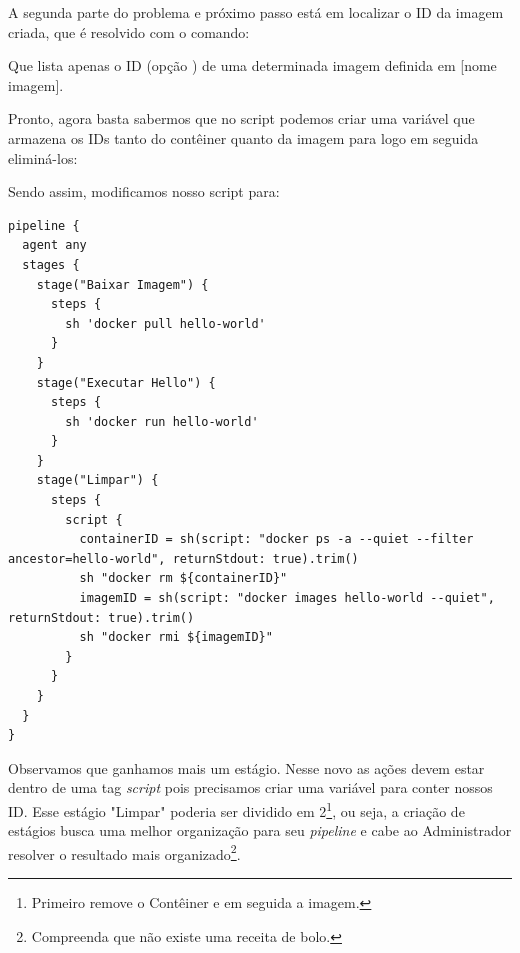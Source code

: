 \documentclass[a4paper,11pt]{article}
\begin{document}
A segunda parte do problema e próximo passo está em localizar o ID da imagem criada, que é resolvido com o comando:

Que lista apenas o ID (opção ) de uma determinada imagem definida em [nome imagem].

Pronto, agora basta sabermos que no script podemos criar uma variável que armazena os IDs tanto do contêiner quanto da imagem para logo em seguida eliminá-los: \\

Sendo assim, modificamos nosso script para:
\begin{lstlisting}
pipeline {
  agent any
  stages {
    stage("Baixar Imagem") {
      steps {
        sh 'docker pull hello-world'
      }
    }
    stage("Executar Hello") {
      steps {
        sh 'docker run hello-world'
      }
    }
    stage("Limpar") {
      steps {
        script {
          containerID = sh(script: "docker ps -a --quiet --filter ancestor=hello-world", returnStdout: true).trim()
          sh "docker rm ${containerID}"
          imagemID = sh(script: "docker images hello-world --quiet", returnStdout: true).trim()
          sh "docker rmi ${imagemID}"
        }
      }
    }        
  }
}
\end{lstlisting}

Observamos que ganhamos mais um estágio. Nesse novo as ações devem estar dentro de uma tag \textit{script} pois precisamos criar uma variável para conter nossos ID. Esse estágio "Limpar" poderia ser dividido em 2\footnote{Primeiro remove o Contêiner e em seguida a imagem.}, ou seja, a criação de estágios busca uma melhor organização para seu \textit{pipeline} e cabe ao Administrador resolver o resultado mais organizado\footnote{Compreenda que não existe uma receita de bolo.}.
\end{document}
